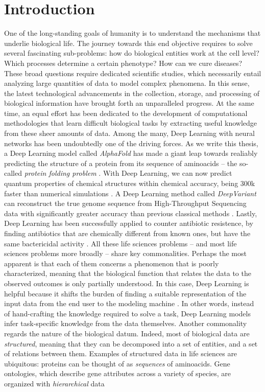 
\chapter{Introduction}\label{ch:introduction}
One of the long-standing goals of humanity is to understand the mechanisms that underlie biological life. The journey towards this end objective requires to solve several fascinating sub-problems: how do biological entities work at the cell level? Which processes determine a certain phenotype? How can we cure diseases? These broad questions require dedicated scientific studies, which necessarily entail analyzing large quantities of data to model complex phenomena. In this sense, the latest technological advancements in the collection, storage, and processing of biological information have brought forth an unparalleled progress. At the same time, an equal effort has been dedicated to the development of computational methodologies that learn difficult biological tasks by extracting useful knowledge from these sheer amounts of data. Among the many, Deep Learning with neural networks \citep{lecun2015naturedeeplearning} has been undoubtedly one of the driving forces. As we write this thesis, a Deep Learning model called \emph{AlphaFold} has made a giant leap towards realiably predicting the structure of a protein from its sequence of aminoacids -- the so-called \emph{protein folding problem} \citep{senior2020alphafold}. With Deep Learning, we can now predict quantum properties of chemical structures within chemical accuracy, being 300k faster than numerical simulations \citep{gilmer2017neuralmessagepassing}. A Deep Learning method called \emph{DeepVariant} can reconstruct the true genome sequence from High-Throughput Sequencing data with significantly greater accuracy than previous classical methods \citep{poplin2018deepvariant}. Lastly, Deep Learning has been successfully applied to counter antibiotic resistence, by finding antibiotics that are chemically different from known ones, but have the same bactericidal activity \citep{stokes2020deeplearningantibiotic}. All these life sciences problems -- and most life sciences problems more broadly -- share key commonalities. Perhaps the most apparent is that each of them concerns a phenomenon that is poorly characterized, meaning that the biological function that relates the data to the observed outcomes is only partially understood. In this case, Deep Learning is helpful because it shifts the burden of finding a suitable representation of the input data from the end user to the modeling machine \citep{bengio2014representationlearning}. In other words, instead of hand-crafting the knowledge required to solve a task, Deep Learning models infer task-specific knowledge from the data themselves. Another commonality regards the nature of the biological datum. Indeed, most of biological data are \emph{structured}, meaning that they can be decomposed into a set of entities, and a set of relations between them. Examples of structured data in life sciences are ubiquitous: proteins can be thought of as \emph{sequences} of aminoacids. Gene ontologies, which describe gene attributes across a variety of species, are organized with \emph{hierarchical} data 